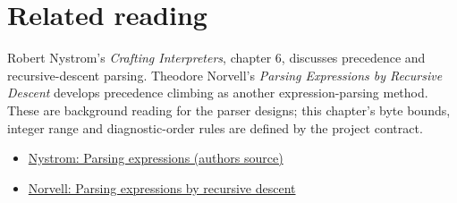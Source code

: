 \section*{Related reading}
Robert Nystrom's \emph{Crafting Interpreters}, chapter 6, discusses precedence and
recursive-descent parsing. Theodore Norvell's \emph{Parsing Expressions by Recursive
  Descent} develops precedence climbing as another expression-parsing method.
These are background reading for the parser designs; this chapter's byte bounds,
integer range and diagnostic-order rules are defined by the project contract.
\begin{itemize}
  \item \href{https://github.com/munificent/craftinginterpreters/blob/master/book/parsing-expressions.md}{Nystrom: Parsing expressions (author\textquotesingle s source)}
  \item \href{https://www.engr.mun.ca/~theo/Misc/exp_parsing.htm}{Norvell: Parsing expressions by recursive descent}
\end{itemize}
